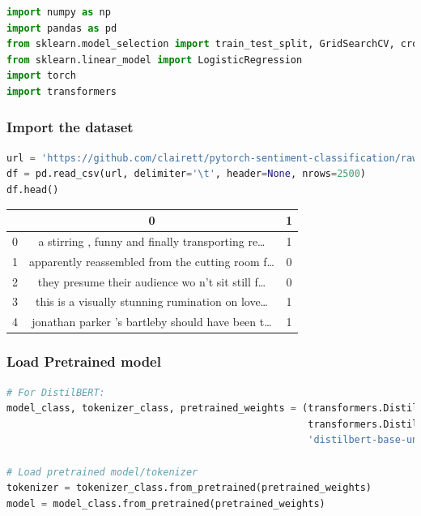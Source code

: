 \begin{lstlisting}[language=Python]
import numpy as np
import pandas as pd
from sklearn.model_selection import train_test_split, GridSearchCV, cross_val_score
from sklearn.linear_model import LogisticRegression
import torch
import transformers
\end{lstlisting}

\subsubsection{Import the dataset}\label{import-the-dataset}

\begin{lstlisting}[language=Python]
url = 'https://github.com/clairett/pytorch-sentiment-classification/raw/master/data/SST2/train.tsv'
df = pd.read_csv(url, delimiter='\t', header=None, nrows=2500)
df.head()
\end{lstlisting}

\begin{table}
    \centering
    \begin{tabular}{ccc}
          & 0 & 1 \\
          \hline
        0 & a stirring , funny and finally transporting re\ldots{} & 1\\
        1 & apparently reassembled from the cutting room f\ldots{} & 0\\
        2 & they presume their audience wo n't sit still f\ldots{} & 0\\
        3 & this is a visually stunning rumination on love\ldots{} & 1\\
        4 & jonathan parker 's bartleby should have been t\ldots{} & 1\\
    \end{tabular}
\end{table}

\subsubsection{Load Pretrained model}\label{load-pretrained-model}

\begin{lstlisting}[language=Python]
# For DistilBERT:
model_class, tokenizer_class, pretrained_weights = (transformers.DistilBertModel,
                                                    transformers.DistilBertTokenizer,
                                                    'distilbert-base-uncased')

# Load pretrained model/tokenizer
tokenizer = tokenizer_class.from_pretrained(pretrained_weights)
model = model_class.from_pretrained(pretrained_weights)
\end{lstlisting}

